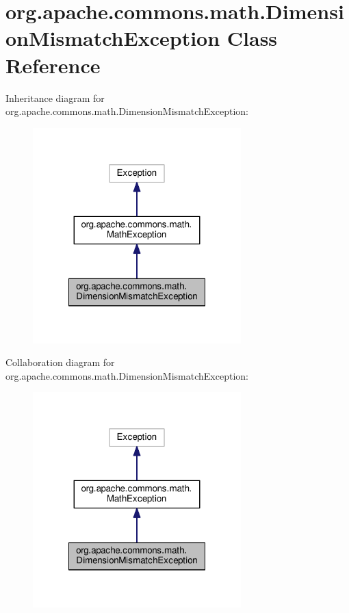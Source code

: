 \section{org.\-apache.\-commons.\-math.\-Dimension\-Mismatch\-Exception Class Reference}
\label{classorg_1_1apache_1_1commons_1_1math_1_1_dimension_mismatch_exception}


Inheritance diagram for org.\-apache.\-commons.\-math.\-Dimension\-Mismatch\-Exception\-:
\nopagebreak
\begin{figure}[H]
\begin{center}
\leavevmode
\includegraphics[width=228pt]{classorg_1_1apache_1_1commons_1_1math_1_1_dimension_mismatch_exception__inherit__graph}
\end{center}
\end{figure}


Collaboration diagram for org.\-apache.\-commons.\-math.\-Dimension\-Mismatch\-Exception\-:
\nopagebreak
\begin{figure}[H]
\begin{center}
\leavevmode
\includegraphics[width=228pt]{classorg_1_1apache_1_1commons_1_1math_1_1_dimension_mismatch_exception__coll__graph}
\end{center}
\end{figure}
